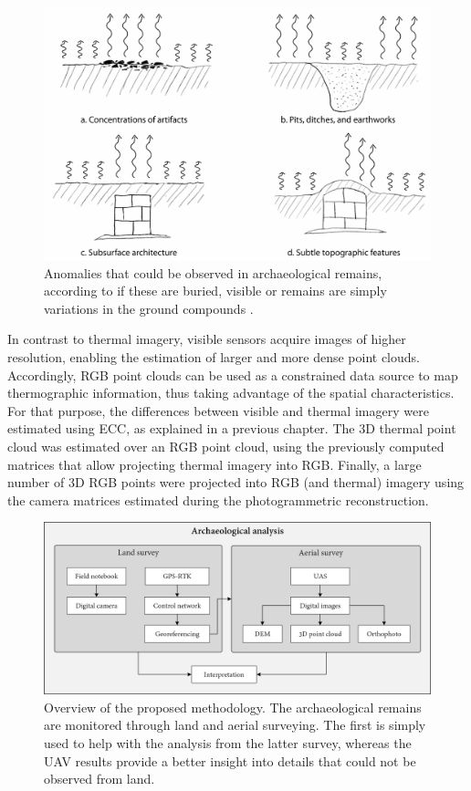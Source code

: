 \begin{figure}[ht]
    \centering
    \includegraphics[width=\linewidth]{figs/castle_puerta_arenas/thermal_exchanging.png}
	\caption{Anomalies that could be observed in archaeological remains, according to if these are buried, visible or remains are simply variations in the ground compounds \cite{casana_archaeological_2017}.}
	\label{fig:thermal_transfer}
\end{figure}

In contrast to thermal imagery, visible sensors acquire images of higher resolution, enabling the estimation of larger and more dense point clouds. Accordingly, RGB point clouds can be used as a constrained data source to map thermographic information, thus taking advantage of the spatial characteristics. For that purpose, the differences between visible and thermal imagery were estimated using ECC, as explained in a previous chapter. The 3D thermal point cloud was estimated over an RGB point cloud, using the previously computed matrices that allow projecting thermal imagery into RGB. Finally, a large number of 3D RGB points were projected into RGB (and thermal) imagery using the camera matrices estimated during the photogrammetric reconstruction. 

\begin{figure}[htbp]
   \centering
    \includegraphics[width=\linewidth]{figs/castle_puerta_arenas/overview.png}
   \caption{Overview of the proposed methodology. The archaeological remains are monitored through land and aerial surveying. The first is simply used to help with the analysis from the latter survey, whereas the UAV results provide a better insight into details that could not be observed from land.}
   \label{fig:thermal_analysis_overview}
\end{figure}

